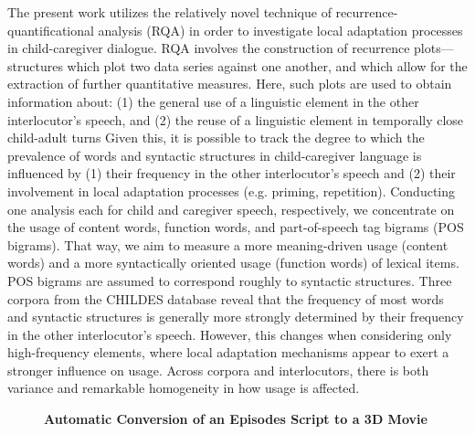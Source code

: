 \documentclass[10pt, a4paper, twopage, headinclude, footinclude, BCOR5mm]{book}
\begin{document}
\begin{table}[t!]
\end{table} 
\noindent
The present work utilizes the relatively novel technique of recurrence-quantificational analysis (RQA) in order to investigate local adaptation processes in child-caregiver dialogue. RQA involves the construction of recurrence plots---structures which plot two data series against one another, and which allow for the extraction of further quantitative measures. Here, such plots are used to obtain information about:  (1) the general use of a linguistic element in the other interlocutor's speech, and (2) the reuse of a linguistic element in temporally close child-adult turns  Given this, it is possible to track the degree to which the prevalence of words and syntactic structures in child-caregiver language is influenced by (1) their frequency in the other interlocutor's speech and (2) their involvement in local adaptation processes (e.g. priming, repetition).  Conducting one analysis each for child and caregiver speech, respectively, we concentrate on the usage of content words, function words, and part-of-speech tag bigrams (POS bigrams). That way, we aim to measure a more meaning-driven usage (content words) and a more syntactically oriented usage (function words) of lexical items. POS bigrams are assumed to correspond roughly to syntactic structures.  Three corpora from the CHILDES database reveal that the frequency of most words and syntactic structures is generally more strongly determined by their frequency in the other interlocutor's speech. However, this changes when considering only high-frequency elements, where local adaptation mechanisms appear to exert a stronger influence on usage. Across corpora and interlocutors, there is both variance and remarkable homogeneity in how usage is affected.  

\newpage

\begin{figure}[t!]
\centering
\large\textbf{Automatic Conversion of an Episodes Script to a 3D Movie}
\vspace*{0.5cm}
\end{figure}
\end{document}
